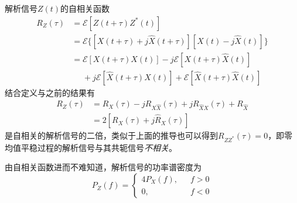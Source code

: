     解析信号$Z(t)$的自相关函数
    \begin{equation}
        \begin{split}
            R_Z(\tau)&=\mathscr{E}[Z(t+\tau)Z^*(t)]\\
                    &=\mathscr{E}\{[X(t+\tau)+j\hat{X}(t+\tau)][X(t)-j\hat{X}(t)]\}\\
                    &=\mathscr{E}[X(t+\tau)X(t)]-j\mathscr{E}[X(t+\tau)\hat{X}(t)]\\
                    &\phantom{=}+j\mathscr{E}[\hat{X}(t+\tau)X(t)]+\mathscr{E}[\hat{X}(t+\tau)\hat{X}(t)]
        \end{split}
    \end{equation}
    结合定义与之前的结果有
    \begin{equation}
        \begin{split}
            R_Z(\tau)&=R_X(\tau)-jR_{X\hat{X}}(\tau)+jR_{\hat{X}X}(\tau)+R_{\hat{X}}\\
                    &=2[R_X(\tau)+j\hat{R}_X(\tau)]
        \end{split}
    \end{equation}
    是自相关的解析信号的二倍，类似于上面的推导也可以得到$R_{ZZ^*}(\tau)=0$，即零均值平稳过程的解析信号与其共轭信号\emph{不相关}。
    
    由自相关函数进而不难知道，解析信号的功率谱密度为
    \begin{equation}\label{eq:jiexigonglv}
        P_Z(f)=\left\{
        \begin{aligned}
            4P_X(f),\phantom{000}f>0\\
            0,\phantom{4P_X(f)00}f<0
        \end{aligned}
        \right.
    \end{equation}
    

